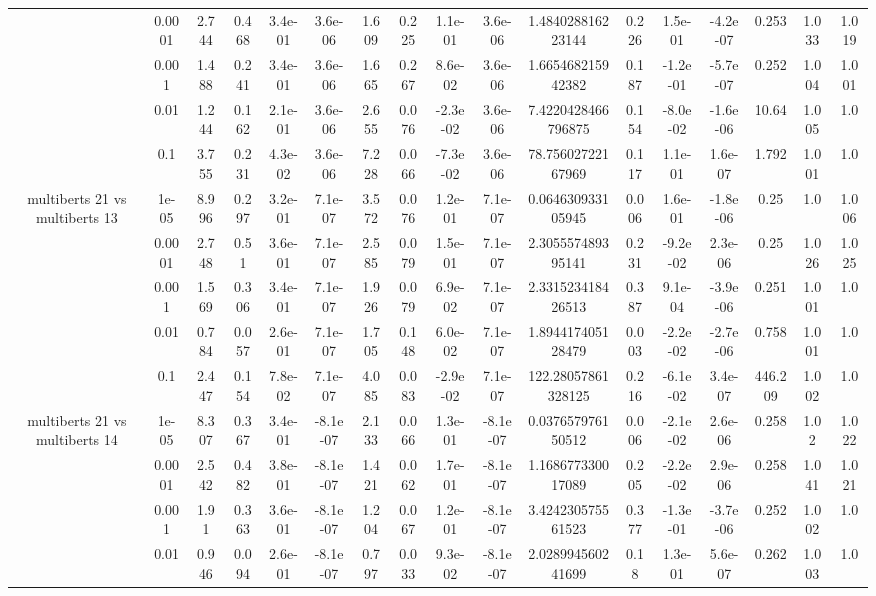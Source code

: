 \begin{tabular}{|c|c|c|c|c|c|c|c|c|c|c|c|c|c|c|c|c|}
 & 0.0001 & 2.744 & 0.468 & 3.4e-01 & 3.6e-06 & 1.609 & 0.225 & 1.1e-01 & 3.6e-06 & 1.484028816223144 & 0.226 & 1.5e-01 & -4.2e-07 & 0.253 & 1.033 & 1.019 \\
 & 0.001 & 1.488 & 0.241 & 3.4e-01 & 3.6e-06 & 1.665 & 0.267 & 8.6e-02 & 3.6e-06 & 1.665468215942382 & 0.187 & -1.2e-01 & -5.7e-07 & 0.252 & 1.004 & 1.001 \\
 & 0.01 & 1.244 & 0.162 & 2.1e-01 & 3.6e-06 & 2.655 & 0.076 & -2.3e-02 & 3.6e-06 & 7.4220428466796875 & 0.154 & -8.0e-02 & -1.6e-06 & 10.64 & 1.005 & 1.0 \\
 & 0.1 & 3.755 & 0.231 & 4.3e-02 & 3.6e-06 & 7.228 & 0.066 & -7.3e-02 & 3.6e-06 & 78.75602722167969 & 0.117 & 1.1e-01 & 1.6e-07 & 1.792 & 1.001 & 1.0 \\
\hline
\multirow{5}{*}{multiberts 21 vs multiberts 13} & 1e-05 & 8.996 & 0.297 & 3.2e-01 & 7.1e-07 & 3.572 & 0.076 & 1.2e-01 & 7.1e-07 & 0.064630933105945 & 0.006 & 1.6e-01 & -1.8e-06 & 0.25 & 1.0 & 1.006 \\
 & 0.0001 & 2.748 & 0.51 & 3.6e-01 & 7.1e-07 & 2.585 & 0.079 & 1.5e-01 & 7.1e-07 & 2.305557489395141 & 0.231 & -9.2e-02 & 2.3e-06 & 0.25 & 1.026 & 1.025 \\
 & 0.001 & 1.569 & 0.306 & 3.4e-01 & 7.1e-07 & 1.926 & 0.079 & 6.9e-02 & 7.1e-07 & 2.331523418426513 & 0.387 & 9.1e-04 & -3.9e-06 & 0.251 & 1.001 & 1.0 \\
 & 0.01 & 0.784 & 0.057 & 2.6e-01 & 7.1e-07 & 1.705 & 0.148 & 6.0e-02 & 7.1e-07 & 1.894417405128479 & 0.003 & -2.2e-02 & -2.7e-06 & 0.758 & 1.001 & 1.0 \\
 & 0.1 & 2.447 & 0.154 & 7.8e-02 & 7.1e-07 & 4.085 & 0.083 & -2.9e-02 & 7.1e-07 & 122.28057861328125 & 0.216 & -6.1e-02 & 3.4e-07 & 446.209 & 1.002 & 1.0 \\
\hline
\multirow{5}{*}{multiberts 21 vs multiberts 14} & 1e-05 & 8.307 & 0.367 & 3.4e-01 & -8.1e-07 & 2.133 & 0.066 & 1.3e-01 & -8.1e-07 & 0.037657976150512 & 0.006 & -2.1e-02 & 2.6e-06 & 0.258 & 1.02 & 1.022 \\
 & 0.0001 & 2.542 & 0.482 & 3.8e-01 & -8.1e-07 & 1.421 & 0.062 & 1.7e-01 & -8.1e-07 & 1.168677330017089 & 0.205 & -2.2e-02 & 2.9e-06 & 0.258 & 1.041 & 1.021 \\
 & 0.001 & 1.91 & 0.363 & 3.6e-01 & -8.1e-07 & 1.204 & 0.067 & 1.2e-01 & -8.1e-07 & 3.424230575561523 & 0.377 & -1.3e-01 & -3.7e-06 & 0.252 & 1.002 & 1.0 \\
 & 0.01 & 0.946 & 0.094 & 2.6e-01 & -8.1e-07 & 0.797 & 0.033 & 9.3e-02 & -8.1e-07 & 2.028994560241699 & 0.18 & 1.3e-01 & 5.6e-07 & 0.262 & 1.003 & 1.0 \\

\end{tabular}
